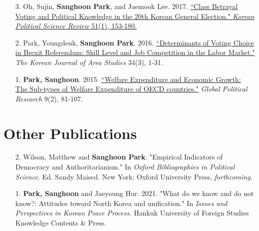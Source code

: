 \documentclass[margin,line]{res}
\begin{document}
\begin{resume}
\begin{enumerate}[leftmargin=*]
\item[3.] Oh, Sujin, \textbf{Sanghoon Park}, and Jaemook Lee. 2017. \href{http://www.dbpia.co.kr/Journal/ArticleDetail/NODE07131578?TotalCount=1&Seq=1&q=%5B%EC%9D%B4%EC%9E%AC%EB%AC%B5%20%EC%98%A4%EC%88%98%EC%A7%84%20%EB%B0%95%EC%83%81%ED%9B%88%20%EA%B3%84%EA%B8%89%ED%88%AC%ED%91%9C%C2%A7coldb%C2%A72%C2%A751%C2%A73%5D&searchWord=%EC%A0%84%EC%B2%B4%3D%5E%24%EC%9D%B4%EC%9E%AC%EB%AC%B5%20%EC%98%A4%EC%88%98%EC%A7%84%20%EB%B0%95%EC%83%81%ED%9B%88%20%EA%B3%84%EA%B8%89%ED%88%AC%ED%91%9C%5E*&Multimedia=0&isIdentifyAuthor=0&Collection=0&SearchAll=%EC%9D%B4%EC%9E%AC%EB%AC%B5%20%EC%98%A4%EC%88%98%EC%A7%84%20%EB%B0%95%EC%83%81%ED%9B%88%20%EA%B3%84%EA%B8%89%ED%88%AC%ED%91%9C&isFullText=0&specificParam=0&SearchMethod=0&Sort=1&SortType=desc&Page=1&PageSize=20#}{``Class Betrayal Voting and Political Knowledge in the 20th Korean General Election." \textit{Korean Political Science Review} 51(1), 153-180.}
\item[2.] Park, Youngdeuk, \textbf{Sanghoon Park}. 2016. \href{http://kiss.kstudy.com/thesis/thesis-view.asp?key=3472800}{``Determinants of Voting Choice in Brexit Referendum: Skill Level and Job Competition in the Labor Market."} \textit{The Korean Journal of Area Studies} 34(3), 1-31.	
\item[1.] \textbf{Park, Sanghoon}. 2015. \href{http://search.koreanstudies.net/thesis/thesis-view.asp?key=3438155}{``Welfare Expenditure and Economic Growth: The Sub-types of Welfare Expenditure of OECD countries."} \textit{Global Political Research} 9(2), 81-107.	
\end{enumerate}

\section{\sc Other Publications}
\begin{enumerate}[leftmargin=*]
  \item[2.] Wilson, Matthew and \textbf{Sanghoon Park}. "Empirical Indicators of Democracy and Authoritarianism." In {\it Oxford Bibliographies in Political Science}. Ed. Sandy Maised. New York: Oxford University Press, {\it forthcoming}.
	\item[1.] \textbf{Park, Sanghoon} and Jaeyoung Hur. 2021. "What do we know and do not know?: Attitudes toward North Korea and unification." In {\it Issues and Perspectives in Korean Peace Process.} Hankuk University of Foreign Studies Knowledge Contents \& Press.
\end{enumerate}


\end{resume}
\end{document}

